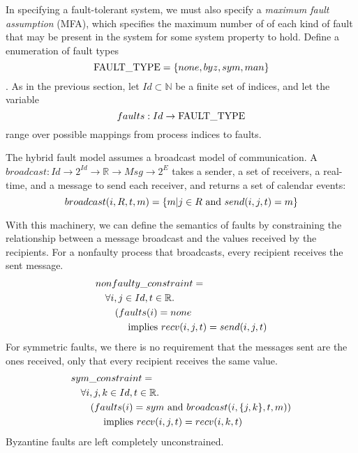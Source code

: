 \documentclass{IEEEtran/IEEEtran}
\newcommand{\lee}[1]{ } %
\newcommand{\lee}[1]{ {\color{blue}$<$lee: #1$>$} } %
\begin{document}
In specifying a fault-tolerant system, we must also specify a \emph{maximum fault assumption} (MFA), which specifies the maximum number of of each kind of fault that may be present in the system for some system property to hold. Define a enumeration of fault types $$\textnormal{FAULT\_TYPE} = \{none, byz, sym, man\}$$. As in the previous section, let $Id \subset \mathbb{N}$ be a finite set of indices, and let the variable $$faults: Id \rightarrow \textnormal{FAULT\_TYPE}$$ range over possible mappings from process indices to faults.

The hybrid fault model assumes a broadcast model of communication.
A $broadcast: Id \rightarrow 2^{Id} \rightarrow \mathbb{R} \rightarrow Msg \rightarrow 2^{E}$ takes a sender, a set of receivers, a real-time, and a message to send each receiver, and returns a set of calendar events:
$$broadcast(i, R, t, m) = \{m | j \in R \textnormal{ and } send(i, j, t) = m\}$$

\lee{msg in SAL is recv here}

With this machinery, we can define the semantics of faults by constraining the relationship between a message broadcast and the values received by the recipients. For a nonfaulty process that broadcasts, every recipient receives the sent message.
\begin{align*}
&nonfaulty\_constraint =\\
  &\quad \forall i, j \in Id, t \in \mathbb{R}.\\
  &\quad\quad (faults(i) = none\\
  &\quad\quad\quad \textnormal{ implies } recv(i, j, t) = send(i, j, t)
\end{align*}
\noindent
For symmetric faults, we there is no requirement that the messages sent are the ones received, only that every recipient receives the same value.
\begin{align*}
&sym\_constraint =\\
  &\quad \forall i, j, k \in Id, t \in \mathbb{R}.\\
  &\quad\quad (faults(i) = sym \textnormal{ and } broadcast(i, \{j, k\}, t, m))\\
  &\quad\quad\quad \textnormal{ implies } recv(i, j, t) = recv(i, k, t)
\end{align*}
\noindent
Byzantine faults are left completely unconstrained.

\end{document}
